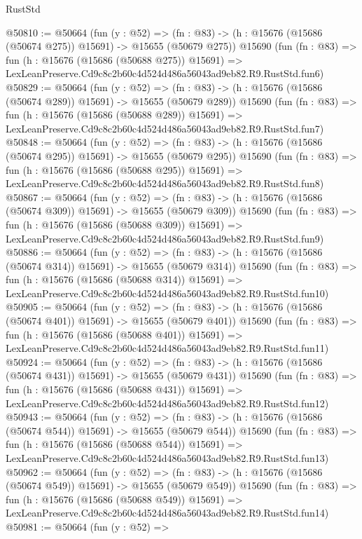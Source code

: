\begin{lexlean}{RustStd}
\begin{coremodule}
@50810 := @50664
    (fun (y : @52) =>
    (fn : @83) -> (h : @15676 (@15686 (@50674 @275)) @15691) -> @15655 (@50679 @275))
    @15690
    (fun (fn : @83) =>
    fun (h : @15676 (@15686 (@50688 @275)) @15691) =>
    LexLeanPreserve.Cd9c8c2b60c4d524d486a56043ad9eb82.R9.RustStd.fun6)
@50829 := @50664
    (fun (y : @52) =>
    (fn : @83) -> (h : @15676 (@15686 (@50674 @289)) @15691) -> @15655 (@50679 @289))
    @15690
    (fun (fn : @83) =>
    fun (h : @15676 (@15686 (@50688 @289)) @15691) =>
    LexLeanPreserve.Cd9c8c2b60c4d524d486a56043ad9eb82.R9.RustStd.fun7)
@50848 := @50664
    (fun (y : @52) =>
    (fn : @83) -> (h : @15676 (@15686 (@50674 @295)) @15691) -> @15655 (@50679 @295))
    @15690
    (fun (fn : @83) =>
    fun (h : @15676 (@15686 (@50688 @295)) @15691) =>
    LexLeanPreserve.Cd9c8c2b60c4d524d486a56043ad9eb82.R9.RustStd.fun8)
@50867 := @50664
    (fun (y : @52) =>
    (fn : @83) -> (h : @15676 (@15686 (@50674 @309)) @15691) -> @15655 (@50679 @309))
    @15690
    (fun (fn : @83) =>
    fun (h : @15676 (@15686 (@50688 @309)) @15691) =>
    LexLeanPreserve.Cd9c8c2b60c4d524d486a56043ad9eb82.R9.RustStd.fun9)
@50886 := @50664
    (fun (y : @52) =>
    (fn : @83) -> (h : @15676 (@15686 (@50674 @314)) @15691) -> @15655 (@50679 @314))
    @15690
    (fun (fn : @83) =>
    fun (h : @15676 (@15686 (@50688 @314)) @15691) =>
    LexLeanPreserve.Cd9c8c2b60c4d524d486a56043ad9eb82.R9.RustStd.fun10)
@50905 := @50664
    (fun (y : @52) =>
    (fn : @83) -> (h : @15676 (@15686 (@50674 @401)) @15691) -> @15655 (@50679 @401))
    @15690
    (fun (fn : @83) =>
    fun (h : @15676 (@15686 (@50688 @401)) @15691) =>
    LexLeanPreserve.Cd9c8c2b60c4d524d486a56043ad9eb82.R9.RustStd.fun11)
@50924 := @50664
    (fun (y : @52) =>
    (fn : @83) -> (h : @15676 (@15686 (@50674 @431)) @15691) -> @15655 (@50679 @431))
    @15690
    (fun (fn : @83) =>
    fun (h : @15676 (@15686 (@50688 @431)) @15691) =>
    LexLeanPreserve.Cd9c8c2b60c4d524d486a56043ad9eb82.R9.RustStd.fun12)
@50943 := @50664
    (fun (y : @52) =>
    (fn : @83) -> (h : @15676 (@15686 (@50674 @544)) @15691) -> @15655 (@50679 @544))
    @15690
    (fun (fn : @83) =>
    fun (h : @15676 (@15686 (@50688 @544)) @15691) =>
    LexLeanPreserve.Cd9c8c2b60c4d524d486a56043ad9eb82.R9.RustStd.fun13)
@50962 := @50664
    (fun (y : @52) =>
    (fn : @83) -> (h : @15676 (@15686 (@50674 @549)) @15691) -> @15655 (@50679 @549))
    @15690
    (fun (fn : @83) =>
    fun (h : @15676 (@15686 (@50688 @549)) @15691) =>
    LexLeanPreserve.Cd9c8c2b60c4d524d486a56043ad9eb82.R9.RustStd.fun14)
@50981 := @50664
    (fun (y : @52) =>

\end{coremodule}
\end{lexlean}
